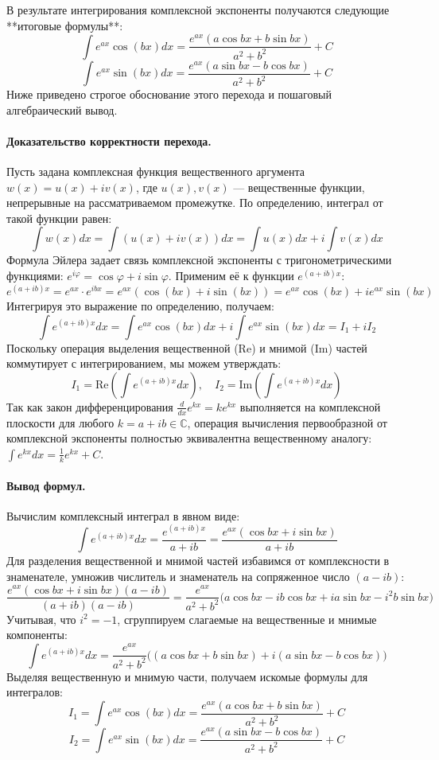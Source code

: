 В результате интегрирования комплексной экспоненты получаются следующие **итоговые формулы**:
$$ \int e^{ax}\cos(bx)dx = \frac{e^{ax}(a\cos bx + b\sin bx)}{a^2+b^2} + C $$
$$ \int e^{ax}\sin(bx)dx = \frac{e^{ax}(a\sin bx - b\cos bx)}{a^2+b^2} + C $$
Ниже приведено строгое обоснование этого перехода и пошаговый алгебраический вывод.

\paragraph{Доказательство корректности перехода.}
Пусть задана комплексная функция вещественного аргумента $w(x) = u(x) + i v(x)$, где $u(x), v(x)$ — вещественные функции, непрерывные на рассматриваемом промежутке. По определению, интеграл от такой функции равен:
$$ \int w(x) dx = \int (u(x) + i v(x)) dx = \int u(x) dx + i \int v(x) dx $$
Формула Эйлера задает связь комплексной экспоненты с тригонометрическими функциями: $e^{i\varphi} = \cos\varphi + i\sin\varphi$. Применим её к функции $e^{(a+ib)x}$:
$$ e^{(a+ib)x} = e^{ax} \cdot e^{ibx} = e^{ax}(\cos(bx) + i \sin(bx)) = e^{ax}\cos(bx) + i e^{ax}\sin(bx) $$
Интегрируя это выражение по определению, получаем:
$$ \int e^{(a+ib)x} dx = \int e^{ax}\cos(bx) dx + i \int e^{ax}\sin(bx) dx = I_1 + i I_2 $$
Поскольку операция выделения вещественной ($\text{Re}$) и мнимой ($\text{Im}$) частей коммутирует с интегрированием, мы можем утверждать:
$$ I_1 = \text{Re} \left( \int e^{(a+ib)x} dx \right), \quad I_2 = \text{Im} \left( \int e^{(a+ib)x} dx \right) $$
Так как закон дифференцирования $\frac{d}{dx} e^{kx} = k e^{kx}$ выполняется на комплексной плоскости для любого $k = a+ib \in \mathbb{C}$, операция вычисления первообразной от комплексной экспоненты полностью эквивалентна вещественному аналогу: $\int e^{kx} dx = \frac{1}{k} e^{kx} + C$.

\paragraph{Вывод формул.}
Вычислим комплексный интеграл в явном виде:
$$ \int e^{(a+ib)x} dx = \frac{e^{(a+ib)x}}{a+ib} = \frac{e^{ax}(\cos bx + i \sin bx)}{a+ib} $$
Для разделения вещественной и мнимой частей избавимся от комплексности в знаменателе, умножив числитель и знаменатель на сопряженное число $(a-ib)$:
$$ \frac{e^{ax}(\cos bx + i \sin bx)(a-ib)}{(a+ib)(a-ib)} = \frac{e^{ax}}{a^2+b^2} \Big( a\cos bx - i b\cos bx + i a\sin bx - i^2 b\sin bx \Big) $$
Учитывая, что $i^2 = -1$, сгруппируем слагаемые на вещественные и мнимые компоненты:
$$ \int e^{(a+ib)x} dx = \frac{e^{ax}}{a^2+b^2} \Big( (a\cos bx + b\sin bx) + i(a\sin bx - b\cos bx) \Big) $$
Выделяя вещественную и мнимую части, получаем искомые формулы для интегралов:
$$ I_1 = \int e^{ax}\cos(bx)dx = \frac{e^{ax}(a\cos bx + b\sin bx)}{a^2+b^2} + C $$
$$ I_2 = \int e^{ax}\sin(bx)dx = \frac{e^{ax}(a\sin bx - b\cos bx)}{a^2+b^2} + C $$

